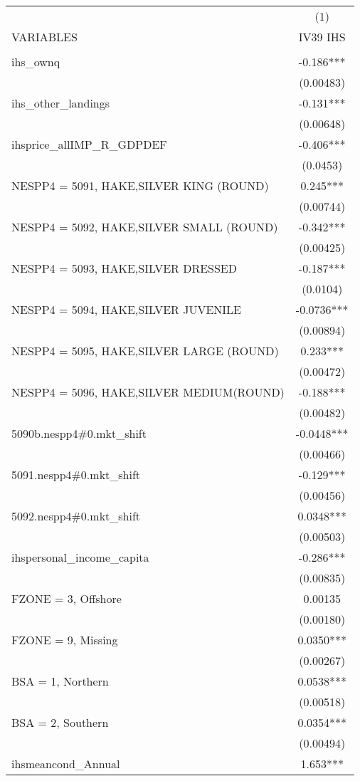 \begin{tabular}{lc} \hline
 & (1) \\
VARIABLES & IV39 IHS \\ \hline
 &  \\
ihs\_ownq & -0.186*** \\
 & (0.00483) \\
ihs\_other\_landings & -0.131*** \\
 & (0.00648) \\
ihsprice\_allIMP\_R\_GDPDEF & -0.406*** \\
 & (0.0453) \\
NESPP4 = 5091, HAKE,SILVER KING (ROUND) & 0.245*** \\
 & (0.00744) \\
NESPP4 = 5092, HAKE,SILVER SMALL (ROUND) & -0.342*** \\
 & (0.00425) \\
NESPP4 = 5093, HAKE,SILVER DRESSED & -0.187*** \\
 & (0.0104) \\
NESPP4 = 5094, HAKE,SILVER JUVENILE & -0.0736*** \\
 & (0.00894) \\
NESPP4 = 5095, HAKE,SILVER LARGE (ROUND) & 0.233*** \\
 & (0.00472) \\
NESPP4 = 5096, HAKE,SILVER MEDIUM(ROUND) & -0.188*** \\
 & (0.00482) \\
5090b.nespp4\#0.mkt\_shift & -0.0448*** \\
 & (0.00466) \\
5091.nespp4\#0.mkt\_shift & -0.129*** \\
 & (0.00456) \\
5092.nespp4\#0.mkt\_shift & 0.0348*** \\
 & (0.00503) \\
ihspersonal\_income\_capita & -0.286*** \\
 & (0.00835) \\
FZONE = 3, Offshore & 0.00135 \\
 & (0.00180) \\
FZONE = 9, Missing & 0.0350*** \\
 & (0.00267) \\
BSA = 1, Northern & 0.0538*** \\
 & (0.00518) \\
BSA = 2, Southern & 0.0354*** \\
 & (0.00494) \\
ihsmeancond\_Annual & 1.653*** \\

\end{tabular}
